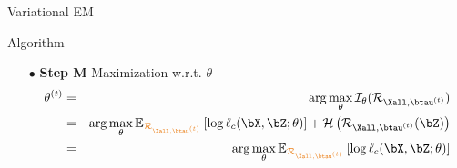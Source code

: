 \documentclass[compress,10pt]{beamer}
\begin{document}
 \begin{frame}{Variational  EM}

\begin{block}{Algorithm}
\begin{enumerate}
 \item[$\bullet$]\textbf{Step M} Maximization  w.r.t.  $\theta$
 \begin{eqnarray*}
 \theta^{(t)} &=& \arg \max_{\theta}   \mathcal{I}_{\theta}(\mathcal{R}_{\Xall,\btau^{(t)}}) \\
 &=&   \arg \max_{\theta} \mathbb{E}_{\color{dgreen}\mathcal{R}_{\Xall,\btau^{(t)}}} \left[\log \ell_c(\bX,\bZ;  \theta)   \right]  +   \mathcal{H}\left(\mathcal{R}_{\Xall,\btau^{(t)}}(\bZ)\right)\\
&=&  \arg \max_{\theta} \mathbb{E}_{\color{dgreen}\mathcal{R}_{\Xall,\btau^{(t)}}} \left[\log \ell_c(\bX,\bZ;  \theta)   \right]  
 \end{eqnarray*}
 
\end{enumerate}

 \end{block} 
 \end{frame}
 
\end{document}
